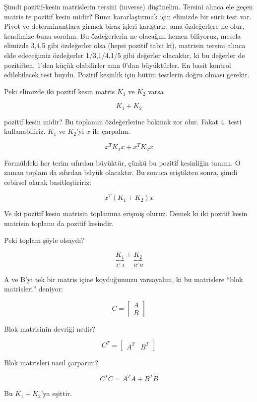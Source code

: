 \documentclass[12pt,fleqn]{article}\usepackage{../../common}
\begin{document}
Şimdi pozitif-kesin matrislerin tersini (inverse) düşünelim. Tersini alınca
ele geçen matris te pozitif kesin midir? Bunu kararlaştırmak için elimizde
bir sürü test var. Pivot ve determinantlara girmek biraz işleri karıştırır,
ama özdeğerlere ne olur, kendimize bunu soralım. Bu özdeğerlerin ne
olacağını hemen biliyoruz, mesela elimizde 3,4,5 gibi özdeğerler olsa
(hepsi pozitif tabii ki), matrisin tersini alınca elde edeceğimiz
özdeğerler 1/3,1/4,1/5 gibi değerler olacaktır, ki bu değerler de
pozitiften. 1'den küçük olabilirler ama 0'dan büyüktürler. En basit kontrol
edilebilecek test buydu. Pozitif kesinlik için bütün testlerin doğru olması
gerekir. 

Peki elimizde iki pozitif kesin matris $K_1$ ve $K_2$ varsa 

$$ K_1 + K_2 $$

pozitif kesin midir? Bu toplamın özdeğerlerine bakmak zor olur. Fakat
4. testi kullanabiliriz. $K_1$ ve $K_2$'yi $x$ ile çarpalım. 

$$ x^TK_1x + x^TK_2x $$

Formüldeki her terim sıfırdan büyüktür, çünkü bu pozitif kesinliğin
tanımı. O zaman toplam da sıfırdan büyük olacaktır. Bu sonuca eriştikten
sonra, şimdi cebirsel olarak basitleştiririz:

$$ x^T(K_1 + K_2)x $$

Ve iki pozitif kesin matrisin toplamına erişmiş oluruz. Demek ki iki
pozitif kesin matrisin toplamı da pozitif kesindir. 

Peki toplam şöyle olsaydı?

$$ \underbrace{K_1}_{A^TA} + \underbrace{K_2}_{B^TB} $$

A ve B'yi tek bir matris içine koyduğumuzu varsayalım, ki bu matrislere
``blok matrisleri'' deniyor:

$$ C = 
\left[\begin{array}{r}
A \\
B
\end{array}\right]
 $$

Blok matrisinin devriği nedir? 

$$ 
C^T = 
\left[\begin{array}{rr}
A^T & B^T
\end{array}\right]
 $$

Blok matrisleri nasıl çarparım?

$$  
C^TC = A^TA + B^TB 
$$  

Bu $K_1 + K_2$'ya eşittir. 
\end{document}

